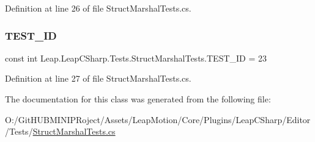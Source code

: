 Definition at line 26 of file Struct\+Marshal\+Tests.\+cs.

\mbox{\label{class_leap_1_1_leap_c_sharp_1_1_tests_1_1_struct_marshal_tests_aca4bb42c952b27e8fb216d3927d3991b}} 
\subsubsection{\texorpdfstring{TEST\_ID}{TEST\_ID}}
{\footnotesize\ttfamily const int Leap.\+Leap\+C\+Sharp.\+Tests.\+Struct\+Marshal\+Tests.\+T\+E\+S\+T\+\_\+\+ID = 23}



Definition at line 27 of file Struct\+Marshal\+Tests.\+cs.



The documentation for this class was generated from the following file\+:\begin{DoxyCompactItemize}
\item 
O\+:/\+Git\+H\+U\+B\+M\+I\+N\+I\+P\+Roject/\+Assets/\+Leap\+Motion/\+Core/\+Plugins/\+Leap\+C\+Sharp/\+Editor/\+Tests/\mbox{\hyperlink{_struct_marshal_tests_8cs}{Struct\+Marshal\+Tests.\+cs}}\end{DoxyCompactItemize}
